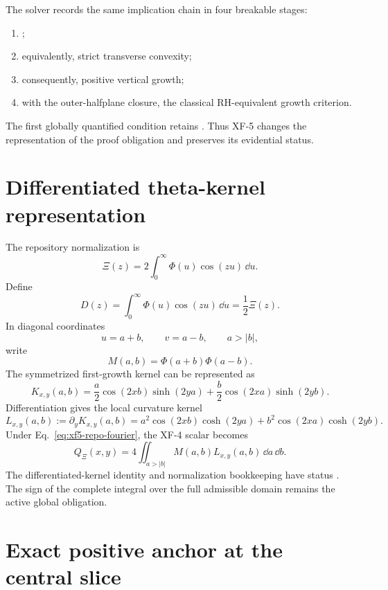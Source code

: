 The solver records the same implication chain in four breakable stages:
\begin{enumerate}
\item {};
\item equivalently, strict transverse convexity;
\item consequently, positive vertical growth;
\item with the outer-halfplane closure, the classical RH-equivalent growth criterion.
\end{enumerate}
The first globally quantified condition retains .  Thus XF-5 changes the representation of the proof obligation and preserves its evidential status.

\section{Differentiated theta-kernel representation}

The repository normalization is
\begin{equation}\label{eq:xf5-repo-fourier}
\Xi(z)=2\int_0^\infty\Phi(u)\cos(zu)\,\dd u.
\end{equation}
Define
\[
D(z)=\int_0^\infty\Phi(u)\cos(zu)\,\dd u=\frac12\Xi(z).
\]
In diagonal coordinates
\[
u=a+b,
\qquad
v=a-b,
\qquad
a>|b|,
\]
write
\[
M(a,b)=\Phi(a+b)\Phi(a-b).
\]
The symmetrized first-growth kernel can be represented as
\begin{equation}\label{eq:xf5-growth-kernel}
K_{x,y}(a,b)
=
\frac a2\cos(2xb)\sinh(2ya)
+
\frac b2\cos(2xa)\sinh(2yb).
\end{equation}
Differentiation gives the local curvature kernel
\begin{equation}\label{eq:xf5-curvature-kernel}
\boxed{
L_{x,y}(a,b)
:=\partial_y K_{x,y}(a,b)
=
a^2\cos(2xb)\cosh(2ya)
+
b^2\cos(2xa)\cosh(2yb).
}
\end{equation}
Under Eq.~\eqref{eq:xf5-repo-fourier}, the XF-4 scalar becomes
\begin{equation}\label{eq:xf5-nonlocal-q}
\boxed{
Q_\Xi(x,y)
=4\iint_{a>|b|}
M(a,b)L_{x,y}(a,b)\,\dd a\,\dd b.
}
\end{equation}
The differentiated-kernel identity and normalization bookkeeping have status .  The sign of the complete integral over the full admissible domain remains the active global obligation.

\section{Exact positive anchor at the central slice}

